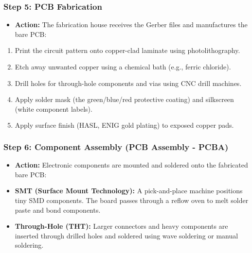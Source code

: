 \subsubsection{Step 5: PCB Fabrication}
\begin{itemize}
  \item   \textbf{Action:} The fabrication house receives the Gerber files and manufactures the bare PCB:
\end{itemize}
\begin{enumerate}
  \item Print the circuit pattern onto copper-clad laminate using photolithography.
  \item Etch away unwanted copper using a chemical bath (e.g., ferric chloride).
  \item Drill holes for through-hole components and vias using CNC drill machines.
  \item Apply solder mask (the green/blue/red protective coating) and silkscreen (white component labels).
  \item Apply surface finish (HASL, ENIG gold plating) to exposed copper pads.
\end{enumerate}

\subsubsection{Step 6: Component Assembly (PCB Assembly - PCBA)}
\begin{itemize}
  \item   \textbf{Action:} Electronic components are mounted and soldered onto the fabricated bare PCB:
  \item   \textbf{SMT (Surface Mount Technology):} A pick-and-place machine positions tiny SMD components. The board passes through a reflow oven to melt solder paste and bond components.
  \item   \textbf{Through-Hole (THT):} Larger connectors and heavy components are inserted through drilled holes and soldered using wave soldering or manual soldering.
\end{itemize}

